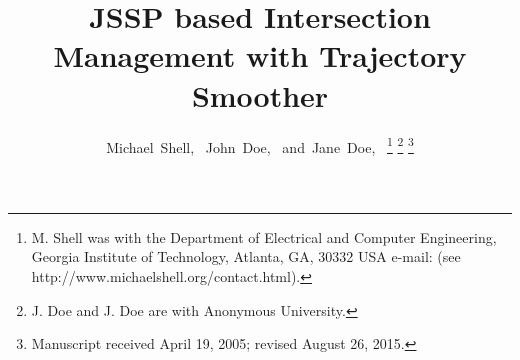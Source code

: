 \documentclass[journal]{IEEEtran}
\begin{document}
%
\title{JSSP based Intersection Management with Trajectory Smoother}
%
%
%

\author{Michael~Shell,~
        John~Doe,~
        and~Jane~Doe,~%
\thanks{M. Shell was with the Department
of Electrical and Computer Engineering, Georgia Institute of Technology, Atlanta,
GA, 30332 USA e-mail: (see http://www.michaelshell.org/contact.html).}%
\thanks{J. Doe and J. Doe are with Anonymous University.}%
\thanks{Manuscript received April 19, 2005; revised August 26, 2015.}}

% 
%
\end{document}
